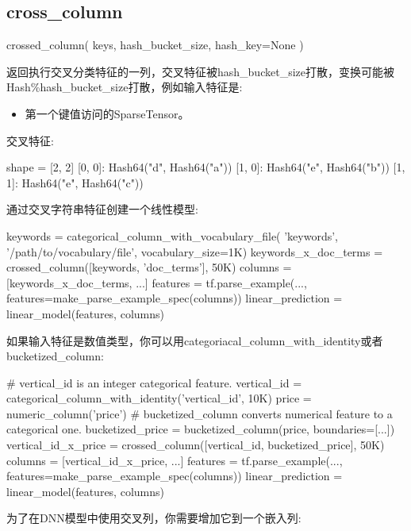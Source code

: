 \subsection{cross\_column}
\begin{python}
crossed_column(
    keys,
    hash_bucket_size,
    hash_key=None
)
\end{python}
返回执行交叉分类特征的一列，交叉特征被hash\_bucket\_size打散，变换可能被Hash\%hash\_bucket\_size打散，例如输入特征是:
\begin{itemize}
	\item 第一个键值访问的SparseTensor。
\end{itemize}
交叉特征:
\begin{python}
 shape = [2, 2]
{
    [0, 0]: Hash64("d", Hash64("a")) %
    [1, 0]: Hash64("e", Hash64("b")) %
    [1, 1]: Hash64("e", Hash64("c")) %
}
\end{python}
通过交叉字符串特征创建一个线性模型:
\begin{python}
keywords = categorical_column_with_vocabulary_file(
    'keywords', '/path/to/vocabulary/file', vocabulary_size=1K)
keywords_x_doc_terms = crossed_column([keywords, 'doc_terms'], 50K)
columns = [keywords_x_doc_terms, ...]
features = tf.parse_example(..., features=make_parse_example_spec(columns))
linear_prediction = linear_model(features, columns)
\end{python}
如果输入特征是数值类型，你可以用categoriacal\_column\_with\_identity或者bucketized\_column:
\begin{python}
# vertical_id is an integer categorical feature.
vertical_id = categorical_column_with_identity('vertical_id', 10K)
price = numeric_column('price')
# bucketized_column converts numerical feature to a categorical one.
bucketized_price = bucketized_column(price, boundaries=[...])
vertical_id_x_price = crossed_column([vertical_id, bucketized_price], 50K)
columns = [vertical_id_x_price, ...]
features = tf.parse_example(..., features=make_parse_example_spec(columns))
linear_prediction = linear_model(features, columns)
\end{python}
为了在DNN模型中使用交叉列，你需要增加它到一个嵌入列:
